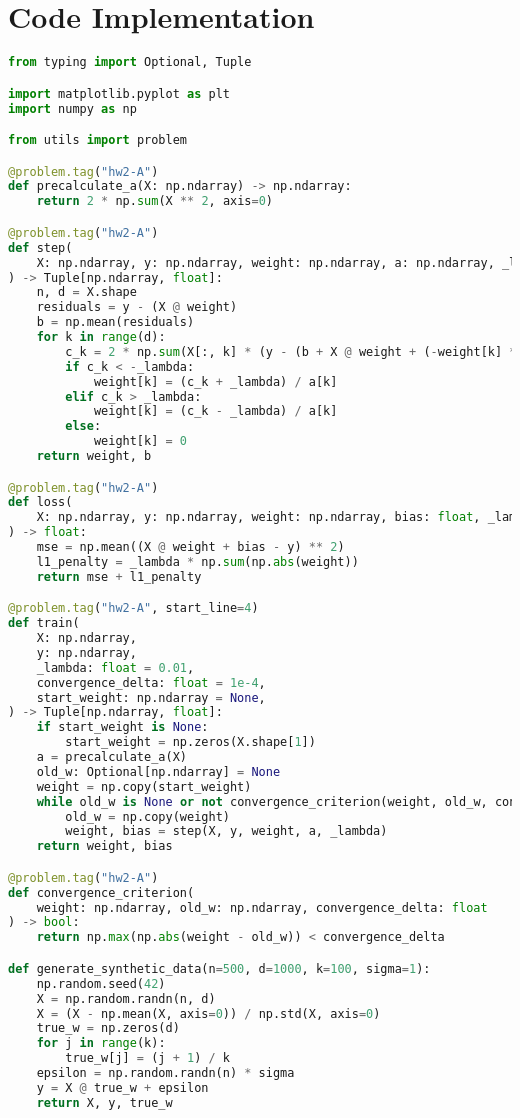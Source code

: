 \documentclass{article}
\begin{document}
\section*{Code Implementation}
\begin{lstlisting}[language=Python]
from typing import Optional, Tuple

import matplotlib.pyplot as plt
import numpy as np

from utils import problem

@problem.tag("hw2-A")
def precalculate_a(X: np.ndarray) -> np.ndarray:
    return 2 * np.sum(X ** 2, axis=0)

@problem.tag("hw2-A")
def step(
    X: np.ndarray, y: np.ndarray, weight: np.ndarray, a: np.ndarray, _lambda: float
) -> Tuple[np.ndarray, float]:
    n, d = X.shape
    residuals = y - (X @ weight)
    b = np.mean(residuals)
    for k in range(d):
        c_k = 2 * np.sum(X[:, k] * (y - (b + X @ weight + (-weight[k] * X[:, k]))))
        if c_k < -_lambda:
            weight[k] = (c_k + _lambda) / a[k]
        elif c_k > _lambda:
            weight[k] = (c_k - _lambda) / a[k]
        else:
            weight[k] = 0
    return weight, b

@problem.tag("hw2-A")
def loss(
    X: np.ndarray, y: np.ndarray, weight: np.ndarray, bias: float, _lambda: float
) -> float:
    mse = np.mean((X @ weight + bias - y) ** 2)
    l1_penalty = _lambda * np.sum(np.abs(weight))
    return mse + l1_penalty

@problem.tag("hw2-A", start_line=4)
def train(
    X: np.ndarray,
    y: np.ndarray,
    _lambda: float = 0.01,
    convergence_delta: float = 1e-4,
    start_weight: np.ndarray = None,
) -> Tuple[np.ndarray, float]:
    if start_weight is None:
        start_weight = np.zeros(X.shape[1])
    a = precalculate_a(X)
    old_w: Optional[np.ndarray] = None
    weight = np.copy(start_weight)
    while old_w is None or not convergence_criterion(weight, old_w, convergence_delta):
        old_w = np.copy(weight)
        weight, bias = step(X, y, weight, a, _lambda)
    return weight, bias

@problem.tag("hw2-A")
def convergence_criterion(
    weight: np.ndarray, old_w: np.ndarray, convergence_delta: float
) -> bool:
    return np.max(np.abs(weight - old_w)) < convergence_delta

def generate_synthetic_data(n=500, d=1000, k=100, sigma=1):
    np.random.seed(42)
    X = np.random.randn(n, d)
    X = (X - np.mean(X, axis=0)) / np.std(X, axis=0)
    true_w = np.zeros(d)
    for j in range(k):
        true_w[j] = (j + 1) / k
    epsilon = np.random.randn(n) * sigma
    y = X @ true_w + epsilon
    return X, y, true_w


\end{lstlisting}
\end{document}
